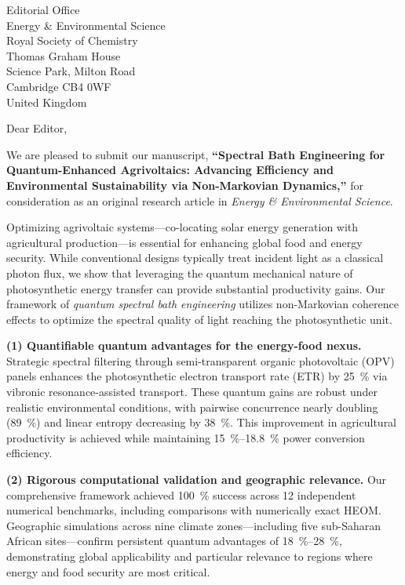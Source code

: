 \documentclass[11pt]{letter}
\begin{document}
\begin{letter}{Editorial Office\\
Energy \& Environmental Science\\
Royal Society of Chemistry\\
Thomas Graham House\\
Science Park, Milton Road\\
Cambridge CB4 0WF\\
United Kingdom}

\opening{Dear Editor,}

We are pleased to submit our manuscript, \textbf{``Spectral Bath Engineering for Quantum-Enhanced Agrivoltaics: Advancing Efficiency and Environmental Sustainability via Non-Markovian Dynamics,''} for consideration as an original research article in \textit{Energy \& Environmental Science}.

Optimizing agrivoltaic systems—co-locating solar energy generation with agricultural production—is essential for enhancing global food and energy security. While conventional designs typically treat incident light as a classical photon flux, we show that leveraging the quantum mechanical nature of photosynthetic energy transfer can provide substantial productivity gains. Our framework of \textit{quantum spectral bath engineering} utilizes non-Markovian coherence effects to optimize the spectral quality of light reaching the photosynthetic unit.

\textbf{(1) Quantifiable quantum advantages for the energy-food nexus.} Strategic spectral filtering through semi-transparent organic photovoltaic (OPV) panels enhances the photosynthetic electron transport rate (ETR) by \SI{25}{\percent} via vibronic resonance-assisted transport. These quantum gains are robust under realistic environmental conditions, with pairwise concurrence nearly doubling (\SI{+89}{\percent}) and linear entropy decreasing by \SI{38}{\percent}. This improvement in agricultural productivity is achieved while maintaining \SIrange{15}{18.8}{\percent} power conversion efficiency.

\textbf{(2) Rigorous computational validation and geographic relevance.} Our comprehensive framework achieved \SI{100}{\percent} success across 12 independent numerical benchmarks, including comparisons with numerically exact HEOM. Geographic simulations across nine climate zones—including five sub-Saharan African sites—confirm persistent quantum advantages of \SIrange{18}{28}{\percent}, demonstrating global applicability and particular relevance to regions where energy and food security are most critical.


\end{letter}
\end{document}
